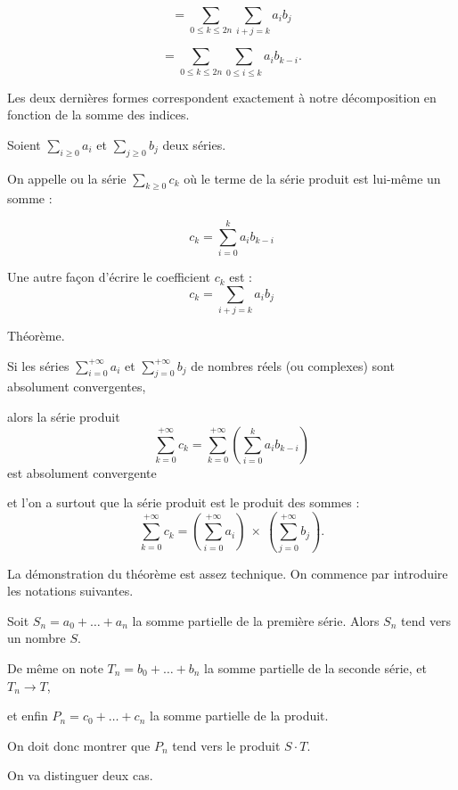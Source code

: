 \change
$$= \sum_{0 \le k \le 2n} \sum_{i+j=k} a_ib_j$$

\change
$$= \sum_{0 \le k \le 2n} \sum_{0 \le i \le k} a_ib_{k-i}.$$

Les deux dernières formes correspondent exactement à notre décomposition 
en fonction de la somme des indices.


\diapo

Soient $\sum_{i \ge 0} a_i$ et $\sum_{j \ge 0} b_j$ deux séries.

\change
On appelle  ou 
la série $\sum_{k \ge 0} c_k$
o\`u le terme de la série produit est lui-même un somme :

$$\displaystyle c_k=\sum_{i=0}^k a_i b_{k-i}$$ 

\change
Une autre façon d'écrire le coefficient $c_k$ est :
$$\displaystyle c_k=\sum_{i+j=k} a_i b_j$$

\diapo

Théorème.

Si les séries $\displaystyle\sum_{i=0}^{+\infty} a_i$ et $\displaystyle\sum_{j=0}^{+\infty} b_j$ de nombres réels (ou complexes)
sont absolument convergentes, 

\change
alors la série produit 
$$\sum_{k=0}^{+\infty} c_k = \sum_{k=0}^{+\infty} \left(\sum_{i=0}^k a_ib_{k-i}\right)$$
est absolument convergente 

\change
et l'on a surtout que la série produit est le produit des sommes :
$$\sum_{k=0}^{+\infty} c_k = \left(\sum_{i=0}^{+\infty} a_i\right)\ \times\ \left(\sum_{j=0}^{+\infty} b_j\right).$$

\change
La démonstration du théorème est assez technique.
On commence par introduire les notations suivantes.

\change
Soit $S_n=a_0+\dots+a_n$ la somme partielle de la première série. Alors $S_n$ tend vers un nombre $S$.

\change
De même on note  
$T_n=b_0+\dots +b_n$ la somme partielle de la seconde série, et $T_n\to T$,
  
\change
et enfin $P_n= c_0+\dots+c_n$ la somme partielle de la produit.

\change
On doit donc montrer que $P_n$ tend vers le produit $S\cdot T$.

\diapo

On va distinguer deux cas.

